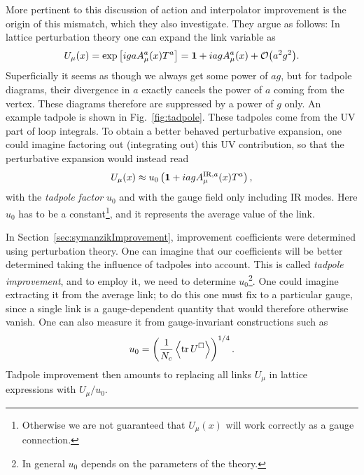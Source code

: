 More pertinent to this discussion of action and interpolator improvement
is the origin of this mismatch, which they also investigate. They argue as
follows: In lattice perturbation theory one can expand the link variable as
\begin{equation}
  U_\mu(x)=\exp\left[igaA_\mu^a(x)T^a\right]
          =\id+iagA_\mu^a(x)+\order{a^2g^2}.
\end{equation}
Superficially it seems as though we always get some power of $ag$, but for
tadpole diagrams, their divergence in $a$ exactly cancels the power of $a$ 
coming from the vertex. These diagrams therefore are suppressed by a
power of $g$ only. An example tadpole is shown in Fig.~\ref{fig:tadpole}.
These tadpoles come from the UV part of loop integrals. To obtain a
better behaved perturbative expansion, one could imagine factoring out
(integrating out) this UV contribution, so that the perturbative expansion
would instead read
\begin{equation}
  U_\mu(x)\approx u_0\left({\mathbf 1}+iagA^{\text{IR},a}_\mu(x)T^a\right),
\end{equation}
with the {\it tadpole factor} $u_0$ and with the gauge field only including 
IR modes. Here $u_0$ has to be a constant\footnote{Otherwise we are not
guaranteed that $U_\mu(x)$ will work correctly as a gauge connection.}, 
and it represents the average value of the link.

In Section~\ref{sec:symanzikImprovement}, improvement coefficients were
determined using perturbation theory. One can imagine that our coefficients
will be better determined taking the influence of tadpoles into account.
This is called {\it tadpole improvement}, and to employ it, we need to
determine $u_0$\footnote{In general $u_0$ depends on the parameters of the
theory.}. One could imagine extracting it from the average link; to do
this one must fix to a particular gauge, since a single link is a
gauge-dependent quantity that would therefore otherwise vanish. One
can also measure it from gauge-invariant constructions such as
\begin{equation}
  u_0=\left(\frac{1}{N_c}\ev{\tr U^\square}\right)^{1/4}.
\end{equation}
Tadpole improvement then amounts to replacing all links $U_\mu$ in lattice
expressions with $U_\mu/u_0$.


